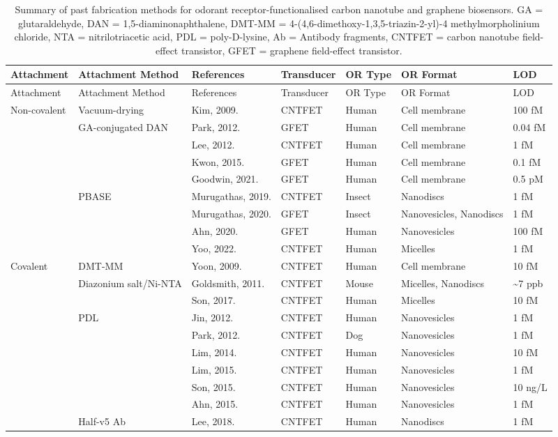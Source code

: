 \documentclass[
  a4paper,
]{scrbook}
\begin{document}
\hypertarget{tbl-or-biosensors}{}
\begin{longtable}[]{@{}lllllll@{}}
\caption{\label{tbl-or-biosensors}Summary of past fabrication methods
for odorant receptor-functionalised carbon nanotube and graphene
biosensors. GA = glutaraldehyde, DAN = 1,5-diaminonaphthalene, DMT-MM =
4-(4,6-dimethoxy-1,3,5-triazin-2-yl)-4 methylmorpholinium chloride, NTA
= nitrilotriacetic acid, PDL = poly-D-lysine, Ab = Antibody fragments,
CNTFET = carbon nanotube field-effect transistor, GFET = graphene
field-effect transistor.}\tabularnewline
\toprule\noalign{}
Attachment & Attachment Method & References & Transducer & OR Type & OR
Format & LOD \\
\midrule\noalign{}
\endfirsthead
\toprule\noalign{}
Attachment & Attachment Method & References & Transducer & OR Type & OR
Format & LOD \\
\midrule\noalign{}
\endhead
\bottomrule\noalign{}
\endlastfoot
Non-covalent & Vacuum-drying & Kim, 2009. \cite{Kim2009a} & CNTFET &
Human & Cell membrane & 100 fM \\
& GA-conjugated DAN & Park, 2012. \cite{Park2012} & GFET & Human & Cell
membrane & 0.04 fM \\
& & Lee, 2012. \cite{Lee2012c} & CNTFET & Human & Cell membrane & 1
fM \\
& & Kwon, 2015. \cite{Kwon2015} & GFET & Human & Cell membrane & 0.1
fM \\
& & Goodwin, 2021. \cite{Goodwin2021} & GFET & Human & Cell membrane &
0.5 pM \\
& PBASE & Murugathas, 2019. \cite{Murugathas2019b} & CNTFET & Insect &
Nanodiscs & 1 fM \\
& & Murugathas, 2020. \cite{Murugathas2020} & GFET & Insect &
Nanovesicles, Nanodiscs & 1 fM \\
& & Ahn, 2020. \cite{Ahn2020} & GFET & Human & Nanovesicles & 100 fM \\
& & Yoo, 2022. \cite{Yoo2022} & CNTFET & Human & Micelles & 1 fM \\
Covalent & DMT-MM & Yoon, 2009. \cite{Yoon2009} & CNTFET & Human & Cell
membrane & 10 fM \\
& Diazonium salt/Ni-NTA & Goldsmith, 2011. \cite{Goldsmith2011} & CNTFET
& Mouse & Micelles, Nanodiscs & \textasciitilde7 ppb \\
& & Son, 2017. \cite{Son2017} & CNTFET & Human & Micelles & 10 fM \\
& PDL & Jin, 2012. \cite{Jin2012} & CNTFET & Human & Nanovesicles & 1
fM \\
& & Park, 2012. \cite{Park2012a} & CNTFET & Dog & Nanovesicles & 1 fM \\
& & Lim, 2014. \cite{Lim2014} & CNTFET & Human & Nanovesicles & 10 fM \\
& & Lim, 2015. \cite{Lim2015} & CNTFET & Human & Nanovesicles & 1 fM \\
& & Son, 2015. \cite{Son2015} & CNTFET & Human & Nanovesicles & 10
ng/L \\
& & Ahn, 2015. \cite{Ahn2015} & CNTFET & Human & Nanovesicles & 1 fM \\
& Half-v5 Ab & Lee, 2018. \cite{Lee2018} & CNTFET & Human & Nanodiscs &
1 fM \\
\end{longtable}
\end{document}
